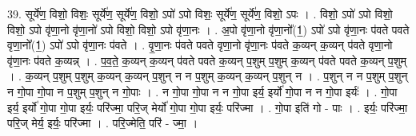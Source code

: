 \documentclass[17pt]{extarticle}
\begin{document}
39. सूर्ये॑ण॒ विशो॒ विशः॒ सूर्ये॑ण॒ सूर्ये॑ण॒ विशो॒ ऽपो॑ ऽपो विशः॒ सूर्ये॑ण॒ सूर्ये॑ण॒ विशो॒ ऽपः । . विशो॒ ऽपो॑ ऽपो विशो॒ विशो॒ ऽपो वृ॑णा॒नो वृ॑णा॒नो॑ ऽपो विशो॒ विशो॒ ऽपो वृ॑णा॒नः । . अ॒पो वृ॑णा॒नो वृ॑णा॒नो᳚(1॒) ऽपो॑ ऽपो वृ॑णा॒नः प॑वते पवते वृणा॒नो᳚(1॒) ऽपो॑ ऽपो वृ॑णा॒नः प॑वते । . वृ॒णा॒नः प॑वते पवते वृणा॒नो वृ॑णा॒नः प॑वते क॒व्यन् क॒व्यन् प॑वते वृणा॒नो वृ॑णा॒नः प॑वते क॒व्यन्न् । . प॒व॒ते॒ क॒व्यन् क॒व्यन् प॑वते पवते क॒व्यन् प॒शुम् प॒शुम् क॒व्यन् प॑वते पवते क॒व्यन् प॒शुम् । . क॒व्यन् प॒शुम् प॒शुम् क॒व्यन् क॒व्यन् प॒शुन् न न प॒शुम् क॒व्यन् क॒व्यन् प॒शुन् न । . प॒शुन् न न प॒शुम् प॒शुन् न गो॒पा गो॒पा न प॒शुम् प॒शुन् न गो॒पाः । . न गो॒पा गो॒पा न न गो॒पा इर्य॒ इर्यो॑ गो॒पा न न गो॒पा इर्यः॑ । . गो॒पा इर्य॒ इर्यो॑ गो॒पा गो॒पा इर्यः॒ परि॑ज्मा॒ परि॒ज् मेर्यो॑ गो॒पा गो॒पा इर्यः॒ परि॑ज्मा । . गो॒पा इति॑ गो - पाः । . इर्यः॒ परि॑ज्मा॒ परि॒ज् मेर्य॒ इर्यः॒ परि॑ज्मा । . परि॒ज्मेति॒ परि॑ - ज्मा॒ । \newline
\pagebreak
\end{document}
